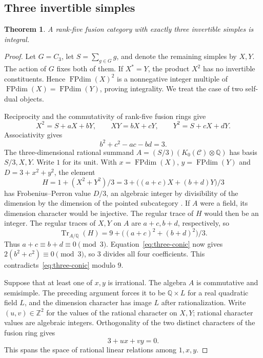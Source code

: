 \documentclass[11pt,a4paper]{article}
\newtheorem{theorem}{Theorem}[section]
\numberwithin{equation}{section}
\begin{document}
\subsection{Three invertible simples}
\begin{theorem}\label{thm:three-inv}
A rank-five fusion category with exactly three invertible simples is integral.
\end{theorem}
\begin{proof}
Let $G=C_3$, let $S=\sum_{g\in G}g$, and denote the remaining simples by $X,Y$.
The action of $G$ fixes both of them. If $X^*=Y$, the product $X^2$ has no
invertible constituents. Hence $\operatorname{FPdim}(X)^2$ is a nonnegative
integer multiple of $\operatorname{FPdim}(X)=\operatorname{FPdim}(Y)$, proving
integrality. We treat the case of two self-dual objects.

Reciprocity and the commutativity of rank-five fusion rings give
\[
 X^2=S+aX+bY,\qquad XY=bX+cY,\qquad Y^2=S+cX+dY.
\]
Associativity gives
\begin{equation}\label{eq:three-conic}
 b^2+c^2-ac-bd=3.
\end{equation}
The three-dimensional rational summand $A=(S/3)(K_0(\mathcal C)\otimes\mathbb Q)$
has basis $S/3,X,Y$. Write $1$ for its unit. With
$x=\operatorname{FPdim}(X)$, $y=\operatorname{FPdim}(Y)$ and
$D=3+x^2+y^2$, the element
\[
 H=1+(X^2+Y^2)/3=3+\big((a+c)X+(b+d)Y\big)/3
\]
has Frobenius--Perron value $D/3$, an algebraic integer by divisibility of the
dimension by the dimension of the pointed subcategory
\cite[Proposition~8.15]{ENO}.
If $A$ were a field, its dimension character would be injective. The regular
trace of $H$ would then be an integer. The regular traces of $X,Y$ on $A$ are
$a+c,b+d$, respectively, so
\[
 \operatorname{Tr}_{A/\mathbb Q}(H)=9+\big((a+c)^2+(b+d)^2\big)/3.
\]
Thus $a+c\equiv b+d\equiv0\pmod3$. Equation~\eqref{eq:three-conic} now gives
$2(b^2+c^2)\equiv0\pmod3$, so $3$ divides all four coefficients. This
contradicts~\eqref{eq:three-conic} modulo $9$.

Suppose that at least one of $x,y$ is irrational. The algebra $A$ is
commutative and semisimple. The preceding argument forces it to be
$\mathbb Q\times L$ for a real quadratic field $L$, and the dimension character
has image $L$ after rationalization. Write $(u,v)\in\mathbb Z^2$ for the
values of the rational character on $X,Y$; rational character values are
algebraic integers. Orthogonality of the two distinct characters of the fusion ring gives
\begin{equation}\label{eq:three-linear}
 3+ux+vy=0.
\end{equation}
This spans the space of rational linear relations among $1,x,y$.


\end{proof}
\end{document}
